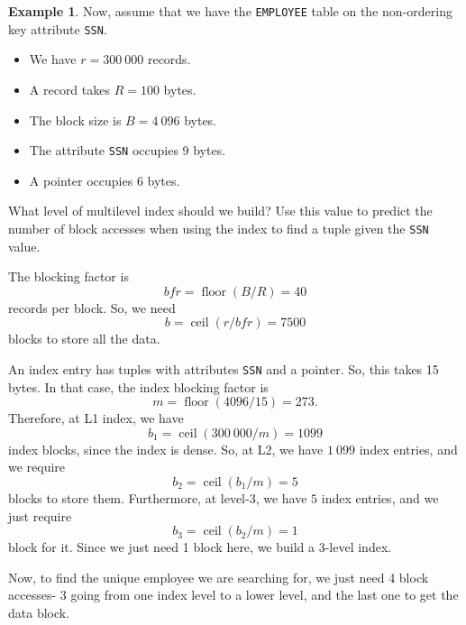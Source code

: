 \documentclass[a4paper, openany]{memoir}
\theoremstyle{definition}
\newtheorem{example}[subsection]{Example}
\begin{document}
\begin{example}
    Now, assume that we have the \texttt{EMPLOYEE} table on the non-ordering key attribute \texttt{SSN}. 
    \begin{itemize}
        \item We have $r = 300 \ 000$ records.
        \item A record takes $R = 100$ bytes.
        \item The block size is $B = 4 \ 096$ bytes.
        \item The attribute \texttt{SSN} occupies 9 bytes.
        \item A pointer occupies 6 bytes.
    \end{itemize}
    What level of multilevel index should we build? Use this value to predict the number of block accesses when using the index to find a tuple given the \texttt{SSN} value.
\end{example}
\begin{answer}
    The blocking factor is
    \[\textit{bfr} = \operatorname{floor}(B/R) = 40\]
    records per block. So, we need
    \[b = \operatorname{ceil}(r/\textit{bfr}) = 7500\]
    blocks to store all the data.

    An index entry has tuples with attributes \texttt{SSN} and a pointer. So, this takes 15 bytes. In that case, the index blocking factor is
    \[m = \operatorname{floor}(4096/15) = 273.\]
    Therefore, at L1 index, we have 
    \[b_1 = \operatorname{ceil}(300 \ 000/m) = 1099\]
    index blocks, since the index is dense. So, at L2, we have $1 \ 099$ index entries, and we require
    \[b_2 = \operatorname{ceil}(b_1/m) = 5\]
    blocks to store them. Furthermore, at level-3, we have $5$ index entries, and we just require
    \[b_3 = \operatorname{ceil}(b_2/m) = 1\]
    block for it. Since we just need 1 block here, we build a 3-level index. 
    
    Now, to find the unique employee we are searching for, we just need 4 block accesses- 3 going from one index level to a lower level, and the last one to get the data block.
\end{answer}
\newpage
\end{document}
